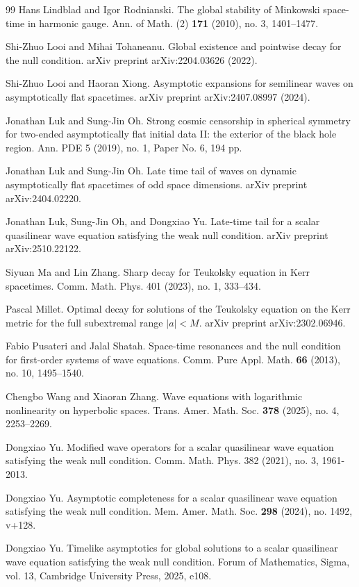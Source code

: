 \documentclass[a4paper,reqno]{amsart}
\theoremstyle{definition}
\numberwithin{equation}{section}
\begin{document}
\begin{thebibliography}{99}
  Hans Lindblad and Igor Rodnianski. 
The global stability of Minkowski space-time in harmonic gauge. 
Ann. of Math. (2) \textbf{171} (2010), no. 3, 1401–1477.


Shi-Zhuo Looi and Mihai Tohaneanu. Global existence and pointwise decay for the null condition. arXiv preprint arXiv:2204.03626 (2022).

Shi-Zhuo Looi and Haoran Xiong. Asymptotic expansions for semilinear waves on asymptotically flat spacetimes. arXiv preprint arXiv:2407.08997 (2024).


 {Jonathan Luk and Sung-Jin Oh.} 
Strong cosmic censorship in spherical symmetry for two-ended asymptotically flat
initial data II: the exterior of the black hole region. 
Ann. PDE 5 (2019), no. 1, Paper No. 6, 194 pp.

 {Jonathan Luk and Sung-Jin Oh.}
Late time tail of waves on dynamic asymptotically flat spacetimes of odd space dimensions.
arXiv preprint  arXiv:2404.02220. 

 {Jonathan Luk, Sung-Jin Oh, and Dongxiao Yu.}
Late-time tail for a scalar quasilinear wave equation satisfying the weak null condition.
arXiv preprint  arXiv:2510.22122.

Siyuan Ma and Lin Zhang. {{Sharp decay for Teukolsky equation in Kerr spacetimes}}. Comm. Math. Phys. 401 (2023), no. 1, 333--434.

Pascal Millet. Optimal decay for solutions of the Teukolsky equation on the Kerr metric for the full subextremal range $|a|<M$. arXiv preprint arXiv:2302.06946. 


 Fabio Pusateri and Jalal Shatah.
Space-time resonances and the null condition for first-order systems of wave equations. 
Comm. Pure Appl. Math. \textbf{66} (2013), no. 10, 1495--1540.

 Chengbo Wang and Xiaoran Zhang.
Wave equations with logarithmic nonlinearity on hyperbolic spaces.
Trans. Amer. Math. Soc. \textbf{378} (2025), no. 4, 2253--2269.

Dongxiao Yu. Modified wave operators for a scalar quasilinear wave equation satisfying the weak null condition. Comm. Math. Phys. 382 (2021), no. 3, 1961-2013.

 Dongxiao Yu. Asymptotic completeness for a scalar quasilinear wave equation satisfying the weak null condition. Mem. Amer.
Math. Soc. \textbf{298} (2024), no. 1492, v+128.

 Dongxiao Yu. Timelike asymptotics for global solutions to a scalar quasilinear wave equation satisfying the weak null condition. Forum of Mathematics, Sigma, vol. 13, Cambridge University Press, 2025, e108.


\end{thebibliography}
\end{document}
